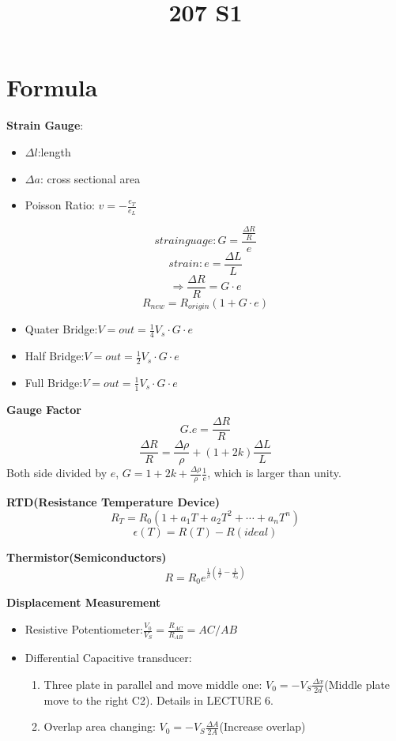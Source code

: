 \documentclass{article}
\title{207 S1}
\begin{document}
  \maketitle
	\normalsize
	\section{Formula}
	\textbf{Strain Gauge}:
	\begin{itemize}
		\item $\Delta l$:length
		\item $\Delta a$: cross sectional area
		\item Poisson Ratio: $v = -\frac{e_T}{e_L}$
	\end{itemize}
	$$strain guage:G=\frac{\frac{\Delta R}{R}}{e}$$
	$$strain: e=\frac{\Delta L}{L}$$
	$$\Rightarrow \frac{\Delta R}{R}=G\cdot e$$
	$$R_{new}=R_{origin}(1+G\cdot e)$$
	
	\begin{itemize}
		\item Quater Bridge:$V={out}=\frac{1}{4}V_s\cdot G\cdot e$
		\item Half Bridge:$V={out}=\frac{1}{2}V_s\cdot G\cdot e$
		\item Full Bridge:$V={out}=\frac{1}{1}V_s\cdot G\cdot e$
	\end{itemize}
	
	
	
	\textbf{Gauge Factor} $$ G.e = \frac{\Delta R}{R} $$
	$$\frac{\Delta R}{R} = \frac{\Delta \rho}{\rho} + (1+2k)\frac{\Delta L}{L}$$
  Both side divided by $e$, $G = 1 + 2k + \frac{\Delta\rho}{\rho}\frac{1}{e}$, which is larger than unity.
	
	
	\textbf{RTD(Resistance Temperature Device)} 
	$$R_T = R_0(1+a_1T + a_2T^2 + \cdots + a_nT^n)$$
	$$\epsilon(T) = R(T) - R(ideal)$$
	
	
	\textbf{Thermistor(Semiconductors)}
	$$R = R_0e^{\frac{1}{\beta}(\frac{1}{T} - \frac{1}{T_0})}$$
	
	
	
	\textbf{Displacement Measurement}
	\begin{itemize}
		\item Resistive Potentiometer:$\displaystyle \frac{V_0}{V_S}=\frac{R_{AC}}{R_{AB}}=AC/AB$
		\item Differential Capacitive transducer:
		\begin{enumerate}
			\item Three plate in parallel and move middle one: $\displaystyle V_0=-V_S\frac{\Delta x}{2d} $(Middle plate move to the right C2). Details in LECTURE 6.
			\item Overlap area changing: $\displaystyle V_0=-V_S\frac{\Delta A}{2A} $(Increase overlap)
		\end{enumerate}
	\end{itemize}
	
\end{document}

